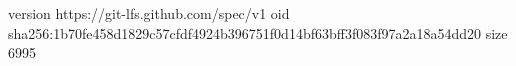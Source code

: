 version https://git-lfs.github.com/spec/v1
oid sha256:1b70fe458d1829c57cfdf4924b396751f0d14bf63bff3f083f97a2a18a54dd20
size 6995
